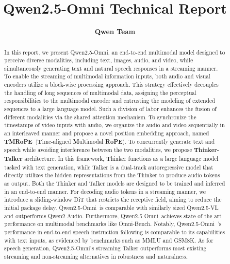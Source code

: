 \documentclass{article} %
\title{Qwen2.5-Omni Technical Report}
\author{
\bf Qwen Team
}
\newcommand{\method}{Qwen2.5-Omni\xspace}
\begin{document}
\maketitle

\begin{abstract}
In this report, we present \method, an end-to-end multimodal model designed to perceive diverse modalities, including text, images, audio, and video, while simultaneously generating text and natural speech responses in a streaming manner. 
To enable the streaming of multimodal information inputs,  both audio and visual encoders utilize a block-wise processing approach. This strategy effectively decouples the handling of long sequences of multimodal data, assigning the perceptual responsibilities to the multimodal encoder and entrusting the modeling of extended sequences to a large language model. Such a division of labor enhances the fusion of different modalities via the shared attention mechanism. 
To synchronize the timestamps of video inputs with audio, we organize the audio and video sequentially in an interleaved manner and propose a novel position embedding approach, named \textbf{TMRoPE}~(\textbf{T}ime-aligned \textbf{M}ultimodal \textbf{RoPE}).
To concurrently generate text and speech while avoiding interference between the two modalities, we propose \textbf{Thinker-Talker} architecture. In this framework, Thinker functions as a large language model tasked with text generation, while Talker is a dual-track autoregressive model that directly utilizes the hidden representations from the Thinker to produce audio tokens as output. Both the Thinker and Talker models are designed to be trained and inferred in an end-to-end manner. 
For decoding audio tokens in a streaming manner, we introduce a sliding-window DiT that restricts the receptive field, aiming to reduce the initial package delay.
\method~is comparable with similarly sized Qwen2.5-VL and outperforms Qwen2-Audio. Furthermore, \method~achieves state-of-the-art performance on multimodal benchmarks like Omni-Bench. Notably, \method~'s performance in end-to-end speech instruction following is comparable to its capabilities with text inputs, as evidenced by benchmarks such as MMLU and GSM8K. As for speech generation, \method's streaming Talker outperforms most existing streaming and non-streaming alternatives in robustness and naturalness.


\end{abstract}
\end{document}
